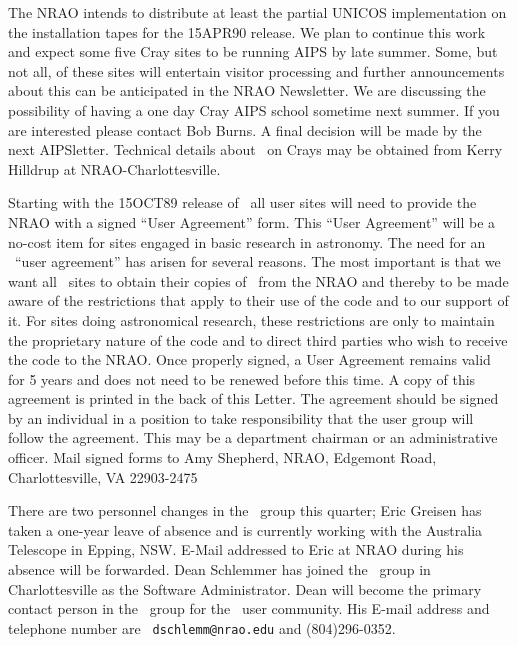 The NRAO intends to distribute at least the partial UNICOS
implementation on the installation tapes for the 15APR90 release.  We
plan to continue this work and expect some five Cray sites to be
running AIPS by late summer.  Some, but not all, of these sites will
entertain visitor processing and further announcements about this can
be anticipated in the NRAO Newsletter.  We are discussing the
possibility of having a one day Cray AIPS school sometime next summer.
If you are interested please contact Bob Burns.  A final decision will
be made by the next AIPSletter.  Technical details about \AIPS\ on
Crays may be obtained from Kerry Hilldrup at NRAO-Charlottesville.

\vfil\eject
{}

   Starting with the 15OCT89 release of \AIPS\ all user sites will
need to provide the NRAO with a signed ``User Agreement'' form.  This
``User Agreement'' will be a no-cost item for sites engaged in basic
research in astronomy.  The need for an \AIPS\ ``user agreement'' has
arisen for several reasons.  The most important is that we want all
\AIPS\ sites to obtain their copies of \AIPS\ from the NRAO and
thereby to be made aware of the restrictions that apply to their use
of the code and to our support of it.  For sites doing astronomical
research, these restrictions are only to maintain the proprietary
nature of the code and to direct third parties who wish to receive the
code to the \hbox{NRAO}.  Once properly signed, a User Agreement
remains valid for 5 years and does not need to be renewed before this
time.  A copy of this agreement is printed in the back of this
\AIPS Letter.  The agreement should be signed by an individual in a
position to take responsibility that the user group will follow the
agreement.  This may be a department chairman or an administrative
officer.  Mail signed forms to Amy Shepherd, NRAO, Edgemont Road,
Charlottesville, VA 22903-2475


     There are two personnel changes in the \AIPS\ group this quarter;
Eric Greisen has taken a one-year leave of absence and is currently
working with the Australia Telescope in Epping, NSW.  E-Mail addressed
to Eric at NRAO during his absence will be forwarded.  Dean Schlemmer
has joined the \AIPS\ group in Charlottesville as the Software
Administrator.  Dean will
become the primary contact person in the \AIPS\ group for the \AIPS\
user community.  His E-mail address and telephone number are {\tt
dschlemm@nrao.edu} and (804)296-0352.

